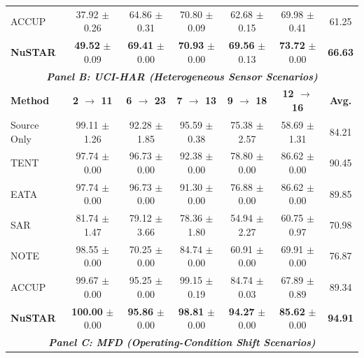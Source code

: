 \documentclass[sigconf, screen, review, anonymous]{acmart}
\theoremstyle{plain}
\theoremstyle{definition}
\theoremstyle{remark}
\begin{document}
\begin{table}[!t]
\begin{small}
\begin{sc}
{\begin{tabular}{l|ccccc|c}
					ACCUP       & 37.92 \scriptsize{$\pm$0.26} & 64.86 \scriptsize{$\pm$0.31} & 70.80 \scriptsize{$\pm$0.09} & 62.68 \scriptsize{$\pm$0.15} & 69.98 \scriptsize{$\pm$0.41} & 61.25 \\
					\rowcolor{graybg}
					\textbf{NuSTAR} & \textbf{49.52} \scriptsize{$\pm$0.09} & \textbf{69.41} \scriptsize{$\pm$0.00} & \textbf{70.93} \scriptsize{$\pm$0.00} & \textbf{69.56} \scriptsize{$\pm$0.13} & \textbf{73.72} \scriptsize{$\pm$0.00} & \textbf{66.63} \\
					\midrule
					\multicolumn{7}{c}{\textbf{\textit{Panel B: UCI-HAR (Heterogeneous Sensor Scenarios)}}} \\
					\midrule
					\textbf{Method} & \textbf{2 $\to$ 11} & \textbf{6 $\to$ 23} & \textbf{7 $\to$ 13} & \textbf{9 $\to$ 18} & \textbf{12 $\to$ 16} & \textbf{Avg.} \\
					\midrule
					Source Only & 99.11 \scriptsize{$\pm$1.26} & 92.28 \scriptsize{$\pm$1.85} & 95.59 \scriptsize{$\pm$0.38} & 75.38 \scriptsize{$\pm$2.57} & 58.69 \scriptsize{$\pm$1.31} & 84.21 \\
					TENT        & 97.74 \scriptsize{$\pm$0.00} & 96.73 \scriptsize{$\pm$0.00} & 92.38 \scriptsize{$\pm$0.00} & 78.80 \scriptsize{$\pm$0.00} & 86.62 \scriptsize{$\pm$0.00} & 90.45 \\
					EATA        & 97.74 \scriptsize{$\pm$0.00} & 96.73 \scriptsize{$\pm$0.00} & 91.30 \scriptsize{$\pm$0.00} & 76.88 \scriptsize{$\pm$0.00} & 86.62 \scriptsize{$\pm$0.00} & 89.85 \\
					SAR         & 81.74 \scriptsize{$\pm$1.47} & 79.12 \scriptsize{$\pm$3.66} & 78.36 \scriptsize{$\pm$1.80} & 54.94 \scriptsize{$\pm$2.27} & 60.75 \scriptsize{$\pm$0.97} & 70.98 \\
					NOTE        & 98.55 \scriptsize{$\pm$0.00} & 70.25 \scriptsize{$\pm$0.00} & 84.74 \scriptsize{$\pm$0.00} & 60.91 \scriptsize{$\pm$0.00} & 69.91 \scriptsize{$\pm$0.00} & 76.87 \\
					ACCUP       & 99.67 \scriptsize{$\pm$0.00} & 95.25 \scriptsize{$\pm$0.00} & 99.15 \scriptsize{$\pm$0.19} & 84.74 \scriptsize{$\pm$0.03} & 67.89 \scriptsize{$\pm$0.89} & 89.34 \\
					\rowcolor{graybg}
					\textbf{NuSTAR} & \textbf{100.00} \scriptsize{$\pm$0.00} & \textbf{95.86} \scriptsize{$\pm$0.00} & \textbf{98.81} \scriptsize{$\pm$0.00} & \textbf{94.27} \scriptsize{$\pm$0.00} & \textbf{85.62} \scriptsize{$\pm$0.00} & \textbf{94.91} \\
					\midrule
					\multicolumn{7}{c}{\textbf{\textit{Panel C: MFD (Operating-Condition Shift Scenarios)}}} \\

\end{tabular}}
\end{sc}
\end{small}
\end{table}
\end{document}
